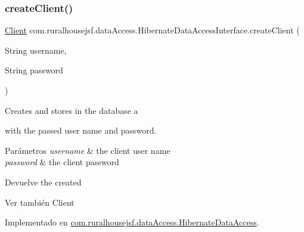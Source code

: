 \subsubsection{\texorpdfstring{createClient()}{createClient()}}
{\footnotesize\ttfamily \mbox{\hyperlink{classcom_1_1ruralhousejsf_1_1domain_1_1_client}{Client}} com.\+ruralhousejsf.\+data\+Access.\+Hibernate\+Data\+Access\+Interface.\+create\+Client (\begin{DoxyParamCaption}\item[{String}]{username,  }\item[{String}]{password }\end{DoxyParamCaption})}

Creates and stores in the database a
\begin{DoxyCode}{0}
\end{DoxyCode}
 with the passed user name and password.


\begin{DoxyParams}{Parámetros}
{\em username} & the client user name \\
\hline
{\em password} & the client password\\
\hline
\end{DoxyParams}
\begin{DoxyReturn}{Devuelve}
the created
\begin{DoxyCode}{0}
\end{DoxyCode}

\end{DoxyReturn}
\begin{DoxySeeAlso}{Ver también}
Client 
\end{DoxySeeAlso}


Implementado en \mbox{\hyperlink{classcom_1_1ruralhousejsf_1_1data_access_1_1_hibernate_data_access_ab1113c4a35f6f888d6bee15f25b117d5}{com.\+ruralhousejsf.\+data\+Access.\+Hibernate\+Data\+Access}}.

\mbox{\label{interfacecom_1_1ruralhousejsf_1_1data_access_1_1_hibernate_data_access_interface_a0fe06262f78319a1fd4c2fd4e9534db8}} 

